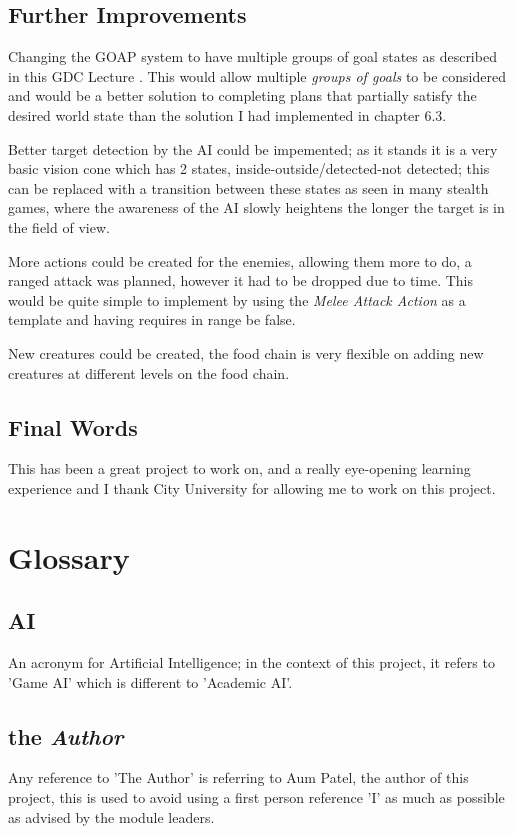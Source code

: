 \documentclass[11pt]{report}
\begin{document}
\section{Further Improvements}
Changing the GOAP system to have multiple groups of goal states as described in this GDC Lecture \cite{10goap}. This would allow multiple \textit{groups of goals} to be considered and would be a better solution to completing plans that partially satisfy the desired world state than the solution I had implemented in chapter 6.3.

Better target detection by the AI could be impemented; as it stands it is a very basic vision cone which has 2 states, inside-outside/detected-not detected; this can be replaced with a transition between these states as seen in many stealth games, where the awareness of the AI slowly heightens the longer the target is in the field of view. 

More actions could be created for the enemies, allowing them more to do, a ranged attack was planned, however it had to be dropped due to time. This would be quite simple to implement by using the \textit{Melee Attack Action} as a template and having requires in range be false.

New creatures could be created, the food chain is very flexible on adding new creatures at different levels on the food chain.

\section{Final Words}

This has been a great project to work on, and a really eye-opening learning experience and I thank City University for allowing me to work on this project.

\chapter{Glossary}
\section{AI}
An acronym for Artificial Intelligence; in the context of this project, it refers to 'Game AI' which is different to 'Academic AI'.

\section{the \textit{Author}}
Any reference to 'The Author' is referring to Aum Patel, the author of this project, this is used to avoid using a first person reference 'I' as much as possible as advised by the module leaders.
\end{document}
